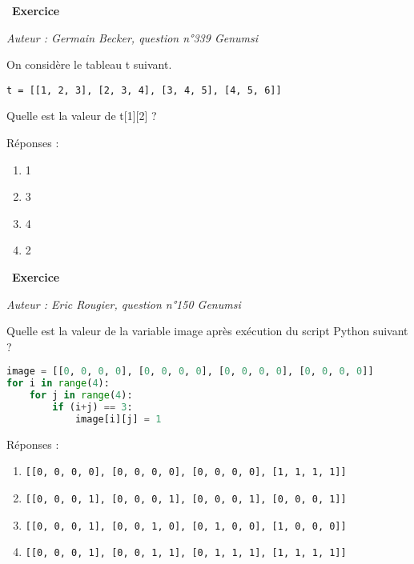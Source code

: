\documentclass[
  11pt,
]{article}
\newcommand{\passthrough}[1]{#1}
\providecommand{\tightlist}{%
  \setlength{\itemsep}{0pt}\setlength{\parskip}{0pt}}
\newcounter{exo}
\newenvironment{exercice}[1]
{\par \medskip   \addtocounter{exo}{1} \noindent  
\begin{bclogo}[arrondi =0.1,   noborder = true, logo=\bccrayon, marge=4]{~\textbf{Exercice} \textbf{\theexo} {\itshape #1} }  \par}
{
\end{bclogo}
 \par \bigskip }
\newcounter{def}
\begin{document}
\begin{exercice}{}

\emph{Auteur : Germain Becker, question n°339 Genumsi}

On considère le tableau t suivant.

\passthrough{\lstinline!t = [[1, 2, 3], [2, 3, 4], [3, 4, 5], [4, 5, 6]]!}

Quelle est la valeur de t{[}1{]}{[}2{]} ?

Réponses :

\begin{enumerate}
\def\labelenumi{\arabic{enumi}.}
\tightlist
\item
  1
\item
  3
\item
  4
\item
  2
\end{enumerate}

\end{exercice}

\begin{exercice}{}

\emph{Auteur : Eric Rougier, question n°150 Genumsi}

Quelle est la valeur de la variable image après exécution du script
Python suivant ?

\begin{lstlisting}[language=Python]
image = [[0, 0, 0, 0], [0, 0, 0, 0], [0, 0, 0, 0], [0, 0, 0, 0]]
for i in range(4):
    for j in range(4):
        if (i+j) == 3:
            image[i][j] = 1
\end{lstlisting}

Réponses :

\begin{enumerate}
\def\labelenumi{\arabic{enumi}.}
\item
  \passthrough{\lstinline![[0, 0, 0, 0], [0, 0, 0, 0], [0, 0, 0, 0], [1, 1, 1, 1]]!}
\item
  \passthrough{\lstinline![[0, 0, 0, 1], [0, 0, 0, 1], [0, 0, 0, 1], [0, 0, 0, 1]]!}
\item
  \passthrough{\lstinline![[0, 0, 0, 1], [0, 0, 1, 0], [0, 1, 0, 0], [1, 0, 0, 0]]!}
\item
  \passthrough{\lstinline![[0, 0, 0, 1], [0, 0, 1, 1], [0, 1, 1, 1], [1, 1, 1, 1]]!}
\end{enumerate}

\end{exercice}
\end{document}
